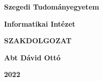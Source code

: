 \documentclass[12pt,numbers=noenddot]{report}
\begin{document}
\pagestyle{fancyplain}
\fancyhf{}
\renewcommand{\headrulewidth}{0pt}	%

\titlespacing*{\chapter}{0pt}{0pt}{40pt}

\newcommand{\szerzo}{Abt Dávid Ottó}
\newcommand{\cim}{Gráf centralitás tenzorokkal és összehasonlításuk (TODO)}


\newpage
\thispagestyle{empty}
\fancyfoot[C]{}	%

\begin{center}

	\vspace*{2cm}

	{\Large\bf Szegedi Tudományegyetem}

	\vspace{.5cm}

	{\Large\bf Informatikai Intézet}

	\vspace*{8.5cm}

	{\Huge\bf SZAKDOLGOZAT}

	\vspace*{7cm}

	{\LARGE\bf \szerzo}

	\vspace*{.6cm}

	{\Large\bf 2022}

\end{center}


\newpage
\thispagestyle{plain}
\end{document}

